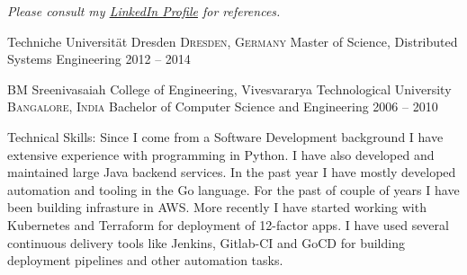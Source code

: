\documentclass[10pt,a4paper]{article}
\begin{document}
\begin{center}
  \emph{Please consult my \href{https://de.linkedin.com/in/arnaik}{LinkedIn Profile} for references.}
\end{center}

\spacedhrule{-0.2em}{-0.4em}


\headedsection
  {Techniche Universit{\"a}t Dresden}
  {\textsc{Dresden, Germany}} {%
  \headedsubsection
    {Master of Science, Distributed Systems Engineering}
    {2012 -- 2014}
    {
    }
}

\headedsection
  {BM Sreenivasaiah College of Engineering, Vivesvararya Technological University}
  {\textsc{Bangalore, India}} {%
  \headedsubsection
    {Bachelor of Computer Science and Engineering}
    {2006 -- 2010}
    {
    }
}

\spacedhrule{1.6em}{-0.4em}


\inlineheadsection  %
  {Technical Skills:}
    {Since I come from a Software Development background I have extensive experience with programming in Python. I have also 
    developed and maintained large Java backend services. In the past year I have mostly developed automation and tooling in
    the Go language. For the past of couple of years I have been building infrasture in AWS. More recently I have started 
    working with Kubernetes and Terraform for deployment of 12-factor apps. I have used several continuous delivery tools
    like Jenkins, Gitlab-CI and GoCD for building deployment pipelines and other automation tasks.}
\end{document}
